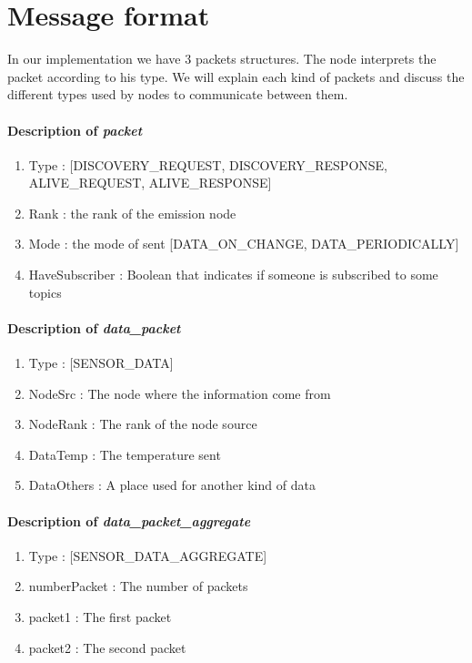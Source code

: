 \documentclass[a4paper,10pt]{article}
\begin{document}
\section{Message format}
\label{msgFormat}
In our implementation we have 3 packets structures. The node interprets the packet according to his type. We will explain each kind of packets and discuss the different types used by nodes to communicate between them.

\paragraph{Description of \textit{packet}}
\begin{enumerate}
\item Type : [DISCOVERY\_REQUEST, DISCOVERY\_RESPONSE, ALIVE\_REQUEST, ALIVE\_RESPONSE]
\item Rank : the rank of the emission node
\item Mode : the mode of sent [DATA\_ON\_CHANGE, DATA\_PERIODICALLY]
\item HaveSubscriber : Boolean that indicates if someone is subscribed to some topics
\end{enumerate}

\paragraph{Description of \textit{data\_packet} }
\begin{enumerate}
\item Type : [SENSOR\_DATA]
\item NodeSrc :  The node where the information come from
\item NodeRank : The rank of the node source
\item DataTemp : The temperature sent
\item DataOthers : A place used for another kind of data
\end{enumerate}

\paragraph{Description of \textit{data\_packet\_aggregate} }
\begin{enumerate}
\item Type : [SENSOR\_DATA\_AGGREGATE]
\item numberPacket : The number of packets
\item packet1 :  The first packet
\item packet2 : The second packet
\end{enumerate}
\end{document}
